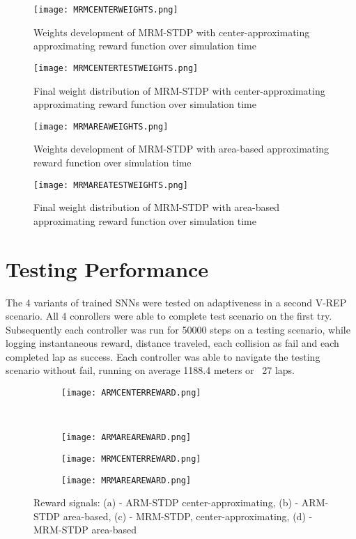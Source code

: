 \begin{figure}[h]
	\centering
	\texttt{[image: MRMCENTERWEIGHTS.png]}
	\caption{Weights development of MRM-STDP with center-approximating approximating reward function over simulation time}\label{fig:mrmcenterweight}
\end{figure}
\begin{figure}[h]
	\centering
	\texttt{[image: MRMCENTERTESTWEIGHTS.png]}
	\caption{Final weight distribution of MRM-STDP with center-approximating approximating reward function over simulation time}\label{fig:mrmcentertestweight}
\end{figure}


\begin{figure}[h]
	\centering
	\texttt{[image: MRMAREAWEIGHTS.png]}
	\caption{Weights development of MRM-STDP with area-based approximating reward function over simulation time}\label{fig:mrmareaweight}
\end{figure}
\begin{figure}[h]
	\centering
	\texttt{[image: MRMAREATESTWEIGHTS.png]}
	\caption{Final weight distribution of MRM-STDP with area-based approximating reward function over simulation time}\label{fig:mrmareatestweight}
\end{figure}

\section{Testing Performance}

The 4 variants of trained SNNs were tested on adaptiveness in a second V-REP scenario. All 4 conrollers were able to complete test scenario on the first try. Subsequently each controller was run for 50000 steps on a testing scenario, while logging instantaneous reward, distance traveled, each collision as fail and each completed lap as success. Each controller was able to navigate the testing scenario without fail, running on average 1188.4 meters or ~27 laps.

\begin{figure*}[t!]
	\centering
	\begin{subfigure}{0.5\textwidth}
		\centering
		\texttt{[image: ARMCENTERREWARD.png]} 
		\caption{}
	\end{subfigure}\\
	\begin{subfigure}{0.5\textwidth}
		\centering	
		\texttt{[image: ARMAREAREWARD.png]}
		\caption{}
	\end{subfigure}
	\begin{subfigure}{0.5\textwidth}
		\centering	
		\texttt{[image: MRMCENTERREWARD.png]}
		\caption{}
	\end{subfigure}
	\begin{subfigure}{0.5\textwidth}
		\centering
		\texttt{[image: MRMAREAREWARD.png]}
		\caption{}
	\end{subfigure}
	\caption{Reward signals: (a) - ARM-STDP center-approximating, (b) - ARM-STDP area-based, (c) - MRM-STDP, center-approximating, (d) - MRM-STDP area-based}\label{fig:trainingReward}
	
\end{figure*}


